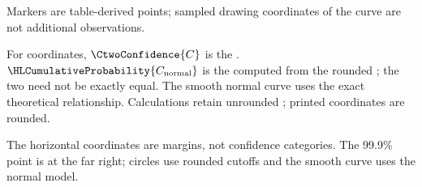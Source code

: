 \begin{landscape}
\begin{minipage}{\linewidth}
\begin{minipage}[t]{.43\linewidth}
Markers are table-derived points; sampled drawing coordinates of the curve are not additional observations.

For  coordinates, $\CtwoConfidence{C}$ is the . $\HLCumulativeProbability{C_{\rm normal}}$ is the  computed from the rounded ; the two need not be exactly equal. The smooth normal curve uses the exact theoretical relationship. Calculations retain unrounded ; printed coordinates are rounded.
\end{minipage}
\end{minipage}
\par\medskip

The horizontal coordinates are margins, not confidence categories. The 99.9\% point is at the far right; circles use rounded cutoffs and the smooth curve uses the normal model.

\end{landscape}
\clearpage
\clearpage
